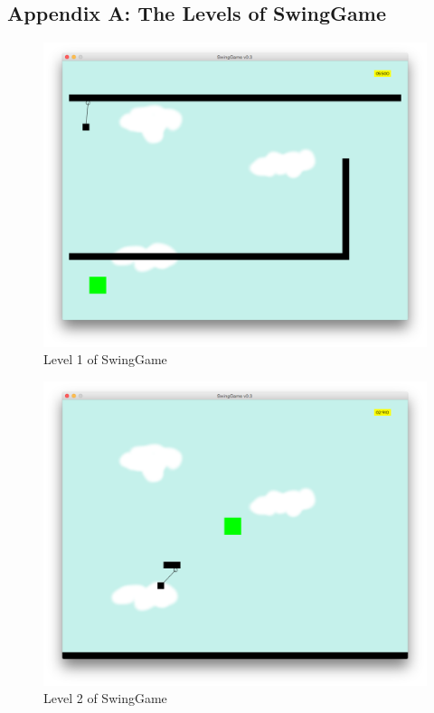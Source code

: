 \documentclass[]{report}
\begin{document}
	\begin{appendices}
		\chapter{Appendix A: The Levels of SwingGame}
		\begin{figure}[H]
			\centering
			\includegraphics[scale=0.25]{level1}
			\caption{Level 1 of SwingGame}
			\label{level1}
		\end{figure}
		\begin{figure}[H]
			\centering
			\includegraphics[scale=0.25]{level2}
			\caption{Level 2 of SwingGame}

\end{figure}
\end{appendices}
\end{document}
